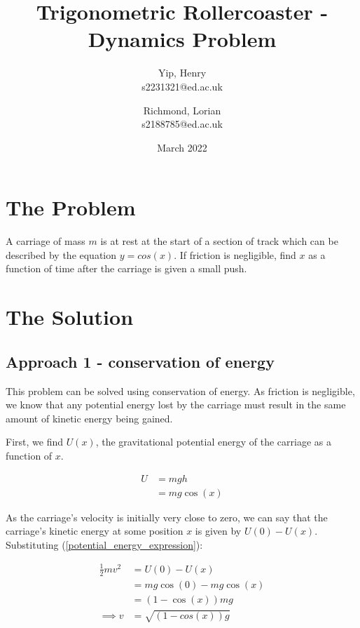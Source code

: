 \documentclass{article}
\title{Trigonometric Rollercoaster - Dynamics Problem}
\author{
    Yip, Henry\\
    s2231321@ed.ac.uk
    \and
    Richmond, Lorian\\
    s2188785@ed.ac.uk
}
\date{March 2022}
\begin{document}
\maketitle

\section{The Problem}

A carriage of mass $m$ is at rest at the start of a section of track which can be described by the equation $y=cos(x)$. If friction is negligible, find $x$ as a function of time after the carriage is given a small push.

\begin{center}
	\label{problem_diagram}
\end{center}

\section{The Solution}

\subsection{Approach 1 - conservation of energy}

This problem can be solved using conservation of energy. As friction is negligible, we know that any potential energy lost by the carriage must result in the same amount of kinetic energy being gained.

First, we find $U(x)$, the gravitational potential energy of the carriage as a function of $x$.

\begin{align}
    U &= mgh\\
    &= mg\cos(x)
    \label{potential_energy_expression}
\end{align}

As the carriage's velocity is initially very close to zero, we can say that the carriage's kinetic energy at some position $x$ is given by $U(0)-U(x)$. Substituting (\ref{potential_energy_expression}):

\begin{align}
    \frac{1}{2}mv^2 &= U(0) - U(x)\\
    &= mg\cos(0) - mg\cos(x)\\
    &= (1-\cos(x))mg\\
    \implies v &= \sqrt{(1-cos(x))g}
\end{align}
\end{document}
